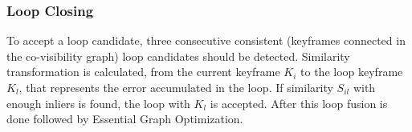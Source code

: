\subsubsection{Loop Closing} 
To accept a loop candidate,  three consecutive consistent (keyframes connected in the co-visibility graph) loop candidates should be detected. Similarity transformation is calculated, from the current keyframe $K_i$ to the loop keyframe $K_l$, that represents the error accumulated in the loop. If similarity $S_{il}$ with  enough inliers is found, the loop with $K_l$ is accepted. After this loop fusion is done followed by Essential Graph Optimization.

